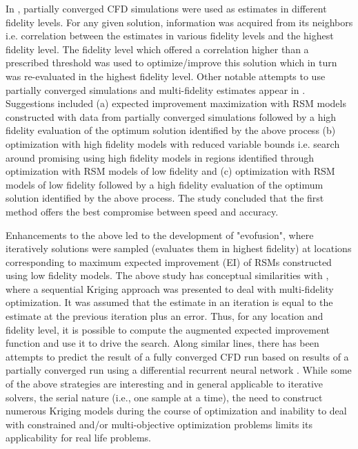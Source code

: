 In \cite{lim2008dynamic}, partially converged CFD simulations were used as estimates in different fidelity levels. For any given solution, information was acquired from its neighbors i.e. correlation between the estimates in various fidelity levels and the highest fidelity level. The fidelity level which offered a correlation higher than a prescribed threshold was used to optimize/improve this solution which in turn was re-evaluated in the highest fidelity level. Other notable attempts to use partially converged simulations and multi-fidelity estimates appear in \cite{forrester2003response}. Suggestions included (a) expected improvement maximization with RSM models constructed with data from partially converged simulations followed by a high fidelity evaluation of the optimum solution identified by the above process (b) optimization with high fidelity models with reduced variable bounds i.e. search around promising using high fidelity models in regions identified through optimization with RSM models of low fidelity and (c) optimization with RSM models of low fidelity followed by a high fidelity evaluation of the optimum solution identified by the above process. The study concluded that the first method offers the best compromise between speed and accuracy. 

Enhancements to the above led to the development of "evofusion", where iteratively solutions were sampled (evaluates them in highest fidelity) at locations corresponding to maximum expected improvement (EI) of RSMs constructed using low fidelity models. The above study has conceptual similarities with \cite{huang2006}, where a sequential Kriging approach was presented to deal with multi-fidelity optimization. It was assumed that the estimate in an iteration is equal to the estimate at the previous iteration plus an error. Thus, for any location and fidelity level, it is possible to compute the augmented expected improvement function and use it to drive the search. Along similar lines, there has been attempts to predict the result of a fully converged CFD run based on results of a partially converged run using a differential recurrent neural network \cite{cao2008design}. While some of the above strategies are interesting and in general applicable to iterative solvers, the serial nature (i.e., one sample at a time), the need to construct numerous Kriging models during the course of optimization and inability to deal with constrained and/or multi-objective optimization problems limits its applicability for real life problems. 


